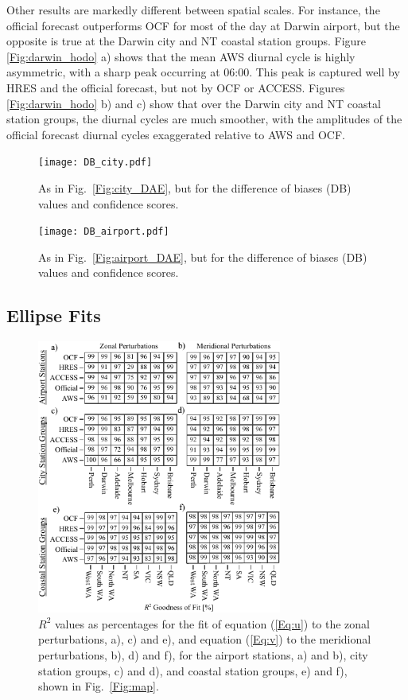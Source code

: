 \documentclass{ametsoc}
\begin{document}
Other results are markedly different between spatial scales. For instance, the official forecast outperforms OCF for most of the day at Darwin airport, but the opposite is true at the Darwin city and NT coastal station groups. Figure \ref{Fig:darwin_hodo} a) shows that the mean AWS diurnal cycle is highly asymmetric, with a sharp peak occurring at 06:00. This peak is captured well by HRES and the official forecast, but not by OCF or ACCESS. Figures \ref{Fig:darwin_hodo} b) and c) show that over the Darwin city and NT coastal station groups, the diurnal cycles are much smoother, with the amplitudes of the official forecast diurnal cycles exaggerated relative to AWS and OCF. 

\begin{figure}
\centering
\texttt{[image: DB\_city.pdf]}
\caption{As in Fig.~\ref{Fig:city_DAE}, but for the difference of biases (DB) values and confidence scores.}
\label{Fig:DB_city}
\end{figure}

\begin{figure}
\centering
\texttt{[image: DB\_airport.pdf]}
\caption{As in Fig.~\ref{Fig:airport_DAE}, but for the difference of biases (DB) values and confidence scores.}
\label{Fig:DB_airport}
\end{figure}

\subsection{Ellipse Fits}

\begin{figure}
\centering
\includegraphics[width=19pc]{r_squared.pdf}
\caption{$R^2$ values as percentages for the fit of equation (\ref{Eq:u}) to the zonal perturbations, a), c) and e), and equation (\ref{Eq:v}) to the meridional perturbations, b), d) and f), for the airport stations, a) and b), city station groups, c) and d), and coastal station groups, e) and f), shown in Fig.~\ref{Fig:map}.}
\label{Fig:r_squared}
\end{figure}
\end{document}
